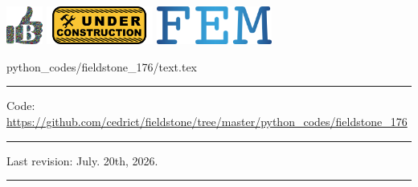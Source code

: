 \noindent
\includegraphics[height=1.25cm]{images/pictograms/benchmark}
\includegraphics[height=1.25cm]{images/pictograms/under_construction}
\includegraphics[height=1.25cm]{images/pictograms/FEM}


\begin{flushright} {\tiny {\color{gray} python\_codes/fieldstone\_176/text.tex}} \end{flushright}

%

\par\noindent\rule{\textwidth}{0.4pt}

\begin{center}
\inpython
{\small Code: \url{https://github.com/cedrict/fieldstone/tree/master/python_codes/fieldstone_176}}
\end{center}

\par\noindent\rule{\textwidth}{0.4pt}

Last revision: July. 20th, 2026.

\par\noindent\rule{\textwidth}{0.4pt}



